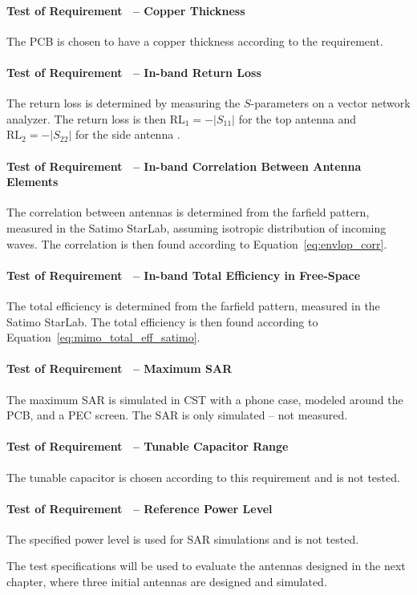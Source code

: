 \paragraph{Test of Requirement~ -- Copper Thickness}
The PCB is chosen to have a copper thickness according to the requirement.

\paragraph{Test of Requirement~ -- In-band Return Loss}
The return loss is determined by measuring the $S$-parameters on a vector network analyzer. The return loss is then $\text{RL}_1 = -|S_{11}|$ for the top antenna and $\text{RL}_2 = -|S_{22}|$ for the side antenna \cite{pozar2011microwave}.

\paragraph{Test of Requirement~ -- In-band Correlation Between Antenna Elements}
The correlation between antennas is determined from the farfield pattern, measured in the Satimo StarLab, assuming isotropic distribution of incoming waves. The correlation is then found according to Equation~\ref{eq:envlop_corr}.

\paragraph{Test of Requirement~ -- In-band Total Efficiency in Free-Space}
The total efficiency is determined from the farfield pattern, measured in the Satimo StarLab.
The total efficiency is then found according to Equation~\ref{eq:mimo_total_eff_satimo}.

\paragraph{Test of Requirement~ -- Maximum SAR}
The maximum SAR is simulated in CST with a phone case, modeled around the PCB, and a PEC screen. The SAR is only simulated -- not measured.

\paragraph{Test of Requirement~ -- Tunable Capacitor Range} 
The tunable capacitor is chosen according to this requirement and is not tested.

\paragraph{Test of Requirement~ -- Reference Power Level}
The specified power level is used for SAR simulations and is not tested.

\begin{aautail}
The test specifications will be used to evaluate the antennas designed in the next chapter, where three initial antennas are designed and simulated.
\end{aautail}


